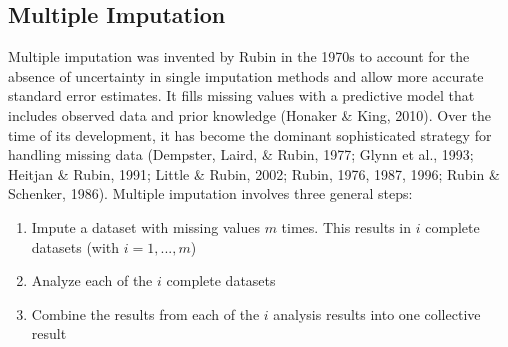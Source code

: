 \documentclass[12pt,econ]{sources/authesis}
\begin{document}
\hypertarget{ordmiss-theory-multimpute}{%
\subsection{Multiple Imputation}\label{ordmiss-theory-multimpute}}

Multiple imputation was invented by Rubin in the 1970s to account for the absence of uncertainty in single imputation methods and allow more accurate standard error estimates. It fills missing values with a predictive model that includes observed data and prior knowledge (Honaker \& King, 2010). Over the time of its development, it has become the dominant sophisticated strategy for handling missing data (Dempster, Laird, \& Rubin, 1977; Glynn et al., 1993; Heitjan \& Rubin, 1991; Little \& Rubin, 2002; Rubin, 1976, 1987, 1996; Rubin \& Schenker, 1986). Multiple imputation involves three general steps:
\begin{enumerate}
\def\labelenumi{(\arabic{enumi})}
\item
  Impute a dataset with missing values \(m\) times. This results in \(i\) complete datasets (with \(i = 1, ..., m\))
\item
  Analyze each of the \(i\) complete datasets
\item
  Combine the results from each of the \(i\) analysis results into one collective result
\end{enumerate}
\vspace{0.8cm}
\end{document}
